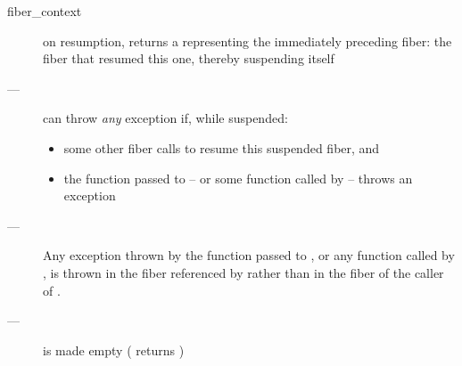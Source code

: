 \returns
\begin{description}
    \item[fiber\_context] on resumption, \xtresumewith returns a \fiber
               representing the immediately preceding fiber: the fiber that
               resumed this one, thereby suspending itself
\end{description}

\except
\begin{description}
    \item[---] \xtresumewith can
              throw \emph{any} exception if, while suspended:
              \begin{itemize}
                  \item some other fiber calls \someresumewith to
                        resume this suspended fiber, and
                  \item the function  passed to \someresumewith
                        -- or some function called
                        by  -- throws an exception
              \end{itemize}
    \item[---] Any exception thrown by the function  passed
              to \xtresumewith, or any function called
              by , is thrown in the fiber referenced by 
              rather than in the fiber of the caller of \xtresumewith.
\end{description}

\postcond
\begin{description}
    \item[---]  is made empty ( returns )
\end{description}



